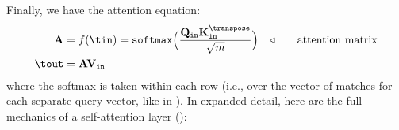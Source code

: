 Finally, we have the attention equation:
\begin{align}
    \mathbf{A} &= f(\tin) = \texttt{softmax}\Big(\frac{\mathbf{Q}_{\texttt{in}}\mathbf{K}_{\texttt{in}}^\transpose}{\sqrt{m}}\Big) &\triangleleft \quad\quad \text{attention matrix}\\
    \tout &= \mathbf{A}\mathbf{V}_{\texttt{in}}
\end{align}
where the softmax is taken within each row (i.e., over the vector of matches for each separate query vector, like in \eqn{\ref{eqn:transformers:attention_question_keys}}). In expanded detail, here are the full mechanics of a self-attention layer (\fig{\ref{fig:transformers:attn_arch}}):
